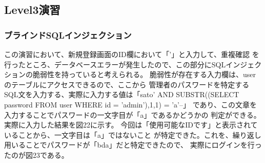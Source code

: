 \documentclass[dvipdfmx,autodetect-engine,titlepage]{jsarticle}
\begin{document}
\subsection{Level3演習}

\subsubsection*{ブラインドSQLインジェクション}
この演習において、新規登録画面のID欄において「'」と入力して、重複確認
を行ったところ、データベースエラーが発生したので、この部分にSQLインジェク
ションの脆弱性を持っていると考えられる。
脆弱性が存在する入力欄は、userのテーブルにアクセスできるので、ここから
管理者のパスワードを特定するSQL文を入力する、実際に入力する値は「sato' AND SUBSTR((SELECT password FROM user WHERE id = 'admin'),1,1) = 'a'--」
であり、この文章を入力することでパスワードの一文字目が「a」であるかどうかの
判定ができる。実際に入力した結果を図22に示す。
今回は「使用可能なIDです」と表示されていることから、一文字目は「a」ではないこと
が特定できた。これを、繰り返し用いることでパスワードが「bda」だと特定できたので、
実際にログインを行ったのが図23である。
\end{document}
